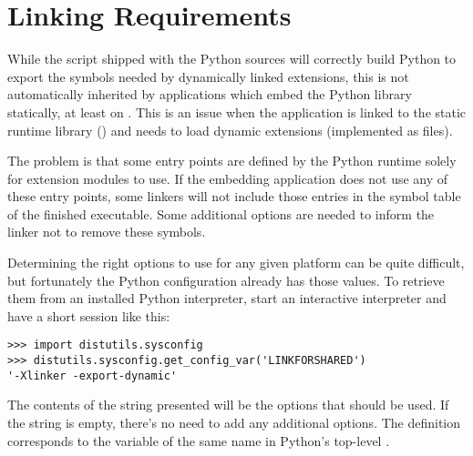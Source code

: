 \section{Linking Requirements
         \label{link-reqs}}

While the  script shipped with the Python sources
will correctly build Python to export the symbols needed by
dynamically linked extensions, this is not automatically inherited by
applications which embed the Python library statically, at least on
\UNIX.  This is an issue when the application is linked to the static
runtime library () and needs to load dynamic
extensions (implemented as  files).

The problem is that some entry points are defined by the Python
runtime solely for extension modules to use.  If the embedding
application does not use any of these entry points, some linkers will
not include those entries in the symbol table of the finished
executable.  Some additional options are needed to inform the linker
not to remove these symbols.

Determining the right options to use for any given platform can be
quite difficult, but fortunately the Python configuration already has
those values.  To retrieve them from an installed Python interpreter,
start an interactive interpreter and have a short session like this:

\begin{verbatim}
>>> import distutils.sysconfig
>>> distutils.sysconfig.get_config_var('LINKFORSHARED')
'-Xlinker -export-dynamic'
\end{verbatim}

The contents of the string presented will be the options that should
be used.  If the string is empty, there's no need to add any
additional options.  The  definition
corresponds to the variable of the same name in Python's top-level
.
